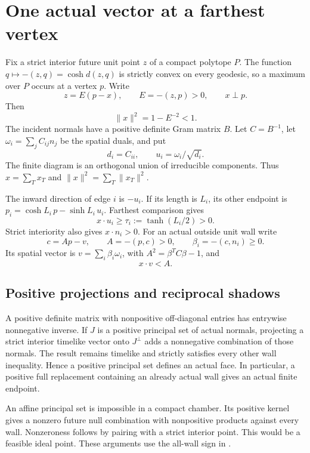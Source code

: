\documentclass[11pt]{article}
\theoremstyle{remark}
\begin{document}
\section{One actual vector at a farthest vertex}\label{sec:geometry}

Fix a strict interior future unit point $z$ of a compact polytope
$P$. The function $q\mapsto-(z,q)=\cosh d(z,q)$ is strictly convex
on every geodesic, so a maximum over $P$ occurs at a vertex $p$.
Write
\[
 z=E(p-x),\qquad E=-(z,p)>0,\qquad x\perp p.
\]
Then
\begin{equation}\label{eq:energy}
 \|x\|^2=1-E^{-2}<1.
\end{equation}
The incident normals have a positive definite Gram matrix $B$.
Let $C=B^{-1}$, let $\omega_i=\sum_j C_{ij}n_j$ be the spatial
duals, and put
\[
 d_i=C_{ii},\qquad u_i=\omega_i/\sqrt{d_i}.
\]
The finite diagram is an orthogonal union of irreducible components.
Thus $x=\sum_Tx_T$ and $\|x\|^2=\sum_T\|x_T\|^2$.

The inward direction of edge $i$ is $-u_i$. If its length is $L_i$,
its other endpoint is $p_i=\cosh L_i\,p-\sinh L_i\,u_i$. Farthest
comparison gives
\begin{equation}\label{eq:half}
 x\cdot u_i\ge\tau_i:=\tanh(L_i/2)>0.
\end{equation}
Strict interiority also gives $x\cdot n_i>0$. For an actual outside
unit wall write
\[
 c=A p-v,\qquad A=-(p,c)>0,\qquad \beta_i=-(c,n_i)\ge0.
\]
Its spatial vector is $v=\sum_i\beta_i\omega_i$, with
$A^2=\beta^TC\beta-1$, and
\begin{equation}\label{eq:interior}
 x\cdot v<A.
\end{equation}

\subsection{Positive projections and reciprocal shadows}

A positive definite matrix with nonpositive off-diagonal entries has
entrywise nonnegative inverse. If $J$ is a positive principal set of
actual normals, projecting a strict interior timelike vector onto
$J^\perp$ adds a nonnegative combination of those normals. The
result remains timelike and strictly satisfies every other wall
inequality. Hence a positive principal set defines an actual face.
In particular, a positive full replacement containing an already
actual wall gives an actual finite endpoint.

An affine principal set is impossible in a compact chamber. Its
positive kernel gives a nonzero future null combination with
nonpositive products against every wall. Nonzeroness follows by
pairing with a strict interior point. This would be a feasible ideal
point. These arguments use the all-wall sign in
\cite[p.~42, \S2.1]{Vin85}.
\end{document}
